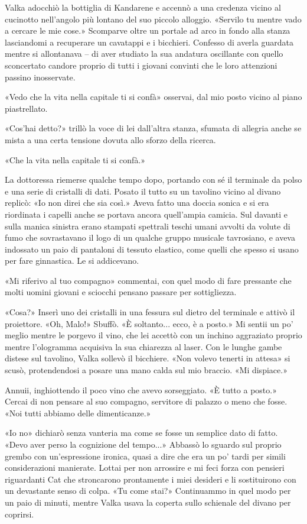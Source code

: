 Valka adocchiò la bottiglia di Kandarene e accennò a una credenza vicino
al cucinotto nell'angolo più lontano del suo piccolo alloggio. «Servilo
tu mentre vado a cercare le mie cose.» Scomparve oltre un portale ad
arco in fondo alla stanza lasciandomi a recuperare un cavatappi e i
bicchieri. Confesso di averla guardata mentre si allontanava -- di aver
studiato la sua andatura oscillante con quello sconcertato candore
proprio di tutti i giovani convinti che le loro attenzioni passino
inosservate.

«Vedo che la vita nella capitale ti si confà» osservai, dal mio posto
vicino al piano piastrellato.

«Cos'hai detto?» trillò la voce di lei dall'altra stanza, sfumata di
allegria anche se mista a una certa tensione dovuta allo sforzo della
ricerca.

«Che la vita nella capitale ti si confà.»

La dottoressa riemerse qualche tempo dopo, portando con sé il terminale
da polso e una serie di cristalli di dati. Posato il tutto su un
tavolino vicino al divano replicò: «Io non direi che sia così.» Aveva
fatto una doccia sonica e si era riordinata i capelli anche se portava
ancora quell'ampia camicia. Sul davanti e sulla manica sinistra erano
stampati spettrali teschi umani avvolti da volute di fumo che
sovrastavano il logo di un qualche gruppo musicale tavrosiano, e aveva
indossato un paio di pantaloni di tessuto elastico, come quelli che
spesso si usano per fare ginnastica. Le si addicevano.

«Mi riferivo al tuo compagno» commentai, con quel modo di fare pressante
che molti uomini giovani e sciocchi pensano passare per sottigliezza.

«Cosa?» Inserì uno dei cristalli in una fessura sul dietro del terminale
e attivò il proiettore. «Oh, Malo!» Sbuffò. «È soltanto... ecco, è a
posto.» Mi sentii un po' meglio mentre le porgevo il vino, che lei
accettò con un inchino aggraziato proprio mentre l'ologramma acquisiva
la sua chiarezza al laser. Con le lunghe gambe distese sul tavolino,
Valka sollevò il bicchiere. «Non volevo tenerti in attesa» si scusò,
protendendosi a posare una mano calda sul mio braccio. «Mi dispiace.»

Annuii, inghiottendo il poco vino che avevo sorseggiato. «È tutto a
posto.» Cercai di non pensare al suo compagno, servitore di palazzo o
meno che fosse. «Noi tutti abbiamo delle dimenticanze.»

«Io no» dichiarò senza vanteria ma come se fosse un semplice dato di
fatto. «Devo aver perso la cognizione del tempo...» Abbassò lo sguardo
sul proprio grembo con un'espressione ironica, quasi a dire che era un
po' tardi per simili considerazioni manierate. Lottai per non arrossire
e mi feci forza con pensieri riguardanti Cat che stroncarono prontamente
i miei desideri e li sostituirono con un devastante senso di colpa. «Tu
come stai?» Continuammo in quel modo per un paio di minuti, mentre Valka
usava la coperta sullo schienale del divano per coprirsi.

